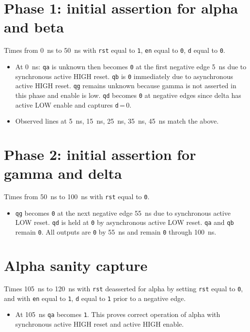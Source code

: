 \documentclass[11pt]{article}
\begin{document}
\section*{Phase 1: initial assertion for alpha and beta}
Times from \SI{0}{ns} to \SI{50}{ns} with \texttt{rst} equal to \texttt{1}, \texttt{en} equal to \texttt{0}, \texttt{d} equal to \texttt{0}.
\begin{itemize}
  \item At \SI{0}{ns}: \texttt{qa} is unknown then becomes \texttt{0} at the first negative edge \SI{5}{ns} due to synchronous active HIGH reset. \texttt{qb} is \texttt{0} immediately due to asynchronous active HIGH reset. \texttt{qg} remains unknown because gamma is not asserted in this phase and enable is low. \texttt{qd} becomes \texttt{0} at negative edges since delta has active LOW enable and captures \texttt{d}\,=\,0.
  \item Observed lines at \SI{5}{ns}, \SI{15}{ns}, \SI{25}{ns}, \SI{35}{ns}, \SI{45}{ns} match the above.
\end{itemize}

\section*{Phase 2: initial assertion for gamma and delta}
Times from \SI{50}{ns} to \SI{100}{ns} with \texttt{rst} equal to \texttt{0}.
\begin{itemize}
  \item \texttt{qg} becomes \texttt{0} at the next negative edge \SI{55}{ns} due to synchronous active LOW reset. \texttt{qd} is held at \texttt{0} by asynchronous active LOW reset. \texttt{qa} and \texttt{qb} remain \texttt{0}. All outputs are \texttt{0} by \SI{55}{ns} and remain \texttt{0} through \SI{100}{ns}.
\end{itemize}

\section*{Alpha sanity capture}
Times \SI{105}{ns} to \SI{120}{ns} with \texttt{rst} deasserted for alpha by setting \texttt{rst} equal to \texttt{0}, and with \texttt{en} equal to \texttt{1}, \texttt{d} equal to \texttt{1} prior to a negative edge.
\begin{itemize}
  \item At \SI{105}{ns} \texttt{qa} becomes \texttt{1}. This proves correct operation of alpha with synchronous active HIGH reset and active HIGH enable.
\end{itemize}
\end{document}
